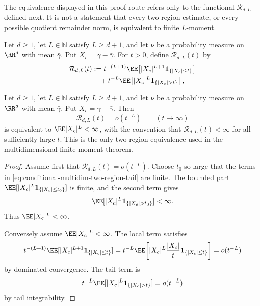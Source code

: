 The equivalence displayed in this proof route refers only to the functional
\(\mathcal R_{d,L}\) defined next.  It is not a statement that every
two-region estimate, or every possible quotient remainder norm, is equivalent
to finite \(L\)-moment.

\begin{definition}%
\label{def:two-region-remainder-functional}
Let \(d\ge1\), let \(L\in\mathbb N\) satisfy \(L\ge d+1\), and let \(\nu\) be
a probability measure on \(\RR^d\) with mean \(\bar{\gamma}\).  Put
\(X_c=\gamma-\bar{\gamma}\).  For \(t>0\), define \(\mathcal R_{d,L}(t)\) by
\begin{equation}\label{eq:conditional-multidim-two-region-tail}
\begin{aligned}
\mathcal R_{d,L}(t)
&:=t^{-(L+1)}\EE\!\left[
|X_c|^{L+1}{\bf1}_{\{|X_c|\le t\}}\right] \\
&\quad{}+ t^{-L}\EE\!\left[
|X_c|^L{\bf1}_{\{|X_c|>t\}}\right],
\end{aligned}
\end{equation}
\end{definition}

\begin{lemma}%
\label{lem:two-region-remainder-equivalent-finite-moment}
Let \(d\ge1\), let \(L\in\mathbb N\) satisfy \(L\ge d+1\), and let \(\nu\) be
a probability measure on \(\RR^d\) with mean \(\bar{\gamma}\).  Put
\(X_c=\gamma-\bar{\gamma}\).  Then
\[
\mathcal R_{d,L}(t)=o(t^{-L})
\qquad(t\to\infty)
\]
is equivalent to \(\EE|X_c|^L<\infty\), with the convention that
\(\mathcal R_{d,L}(t)<\infty\) for all sufficiently large \(t\).
This is the only two-region equivalence used in the multidimensional
finite-moment theorem.
\end{lemma}

\begin{proof}
Assume first that \(\mathcal R_{d,L}(t)=o(t^{-L})\).  Choose \(t_0\) so large
that the terms in \eqref{eq:conditional-multidim-two-region-tail} are finite.
The bounded part \(\EE[|X_c|^L{\bf1}_{\{|X_c|\le t_0\}}]\) is finite, and
the second term gives
\[
\EE[|X_c|^L{\bf1}_{\{|X_c|>t_0\}}]<\infty .
\]
Thus \(\EE|X_c|^L<\infty\).

Conversely assume \(\EE|X_c|^L<\infty\).  The local term satisfies
\[
t^{-(L+1)}\EE[|X_c|^{L+1}{\bf1}_{\{|X_c|\le t\}}]
=t^{-L}\EE\!\left[
|X_c|^L\frac{|X_c|}{t}{\bf1}_{\{|X_c|\le t\}}
\right]
=o(t^{-L})
\]
by dominated convergence.  The tail term is
\[
t^{-L}\EE[|X_c|^L{\bf1}_{\{|X_c|>t\}}]=o(t^{-L})
\]
by tail integrability.
\end{proof}

